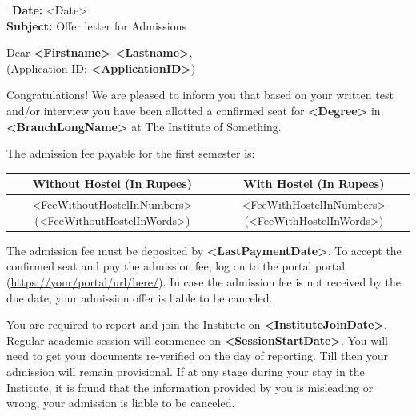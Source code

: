 \documentclass[12pt]{article}
\begin{document}


\thispagestyle{letterfirstpage}

\pagestyle{letter}


{~\hfill \textbf{Date:} <Date>} \\[0.5cm]
\textbf{Subject:} Offer letter for Admissions


Dear \textbf{<Firstname> <Lastname>},\\
(Application ID: \textbf{<ApplicationID>})

Congratulations! We are pleased to inform you that based on your 
written test and/or interview you have been allotted a confirmed seat 
for \textbf{<Degree>} in \textbf{<BranchLongName>} at The Institute 
of Something.

The admission fee payable for the first semester is:

\begin{center}
\begin{tabularx}{\textwidth}{|C|C|}
\hline 
\textbf{Without Hostel (In Rupees)} & \textbf{With Hostel (In Rupees)} 
\\ \hline
<FeeWithoutHostelInNumbers> (<FeeWithoutHostelInWords>) &
<FeeWithHostelInNumbers> (<FeeWithHostelInWords>) \\
\hline
\end{tabularx}
\end{center}

The admission fee must be deposited by \textbf{<LastPaymentDate>}. To 
accept the confirmed seat and pay the admission fee, log on to the portal
portal (\url{https://your/portal/url/here/}). In case the admission 
fee is not received by the due date, your admission offer is liable to 
be canceled.

You are required to report and join the Institute on 
\textbf{<InstituteJoinDate>}. Regular academic session will commence on 
\textbf{<SessionStartDate>}. You will need to get your documents 
re-verified on the day of reporting. Till then your admission will 
remain provisional. If at any stage during your stay in the Institute, 
it is found that the information provided by you is misleading or 
wrong, your admission is liable to be canceled.
\end{document}
